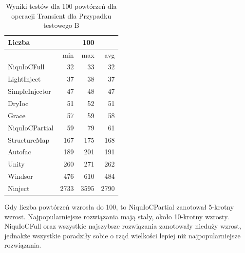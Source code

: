 \documentclass[12pt]{article}
\begin{document}
\begin{table}[H]
\captionsetup{belowskip=0pt,aboveskip=0pt}
\begin{center}
\begin{small}
	\begin{tabular}{ | l | r r r | }
    		\hline
Liczba & & 100 & \\ \hline
 & min & max & avg \\ \hline
NiquIoCFull & 32 & 33 & 32 \\ \hline
LightInject & 37 & 38 & 37 \\ \hline
SimpleInjector & 47 & 48 & 47 \\ \hline
DryIoc & 51 & 52 & 51 \\ \hline
Grace & 57 & 59 & 58 \\ \hline
NiquIoCPartial & 59 & 79 & 61 \\ \hline
StructureMap & 167 & 175 & 168 \\ \hline
Autofac & 189 & 201 & 191 \\ \hline
Unity & 260 & 271 & 262 \\ \hline
Windsor & 476 & 610 & 484 \\ \hline
Ninject & 2733 & 3595 & 2790 \\ \hline
  	\end{tabular}
\end{small}
\end{center}
\caption{Wyniki testów dla 100 powtórzeń dla operacji Transient dla Przypadku testowego B}
\label{TestCaseB_Transient100}
\end{table}
Gdy liczba powtórzeń wzrosła do 100, to NiquIoCPartial zanotował 5-krotny wzrost. Najpopularniejsze rozwiązania mają stały, około 10-krotny wzrosty. NiquIoCFull oraz wszystkie najszybsze rozwiązania zanotowały nieduży wzrost, jednakże wszystkie poradziły sobie o rząd wielkości lepiej niż najpopularniejsze rozwiązania.
\\ \\
\end{document}
